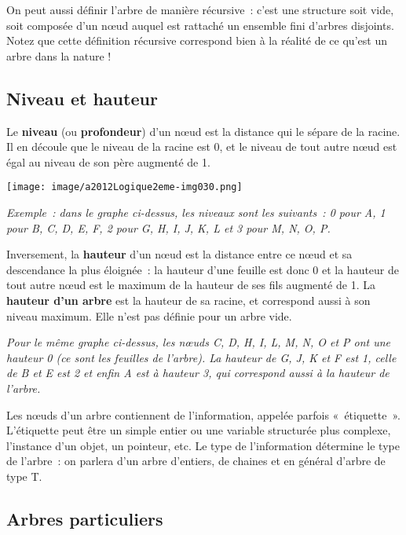 		On peut aussi définir l'arbre de manière récursive~: 
		c'est une structure soit vide, soit composée d'un n{\oe}ud auquel
		est rattaché un ensemble fini d'arbres disjoints. 
		Notez que cette définition récursive correspond bien à la réalité de
		ce qu'est un arbre dans la nature !

	\subsection{Niveau et hauteur}

		Le \textbf{niveau} (ou \textbf{profondeur}) d'un n{\oe}ud 
		est la distance qui le sépare de la racine. Il en découle que
		le niveau de la racine est 0, et le niveau de tout autre 
		n{\oe}ud est égal au niveau de son père augmenté de 1.

		\begin{center}
		\texttt{[image: image/a2012Logique2eme-img030.png]}
		\end{center}

		{\itshape	
		Exemple~: dans le graphe ci-dessus, les niveaux sont les suivants~: 
		0 pour A, 1 pour B, C, D, E, F, 2 pour G, H, I, J, K, L 
		et 3 pour M, N, O, P.}

		Inversement, la \textbf{hauteur} d'un n{\oe}ud est la distance entre 
		ce n{\oe}ud et sa descendance la plus éloignée~: la hauteur d'une 
		feuille est donc 0 et la hauteur de tout autre n{\oe}ud est le maximum 
		de la hauteur de ses fils augmenté de 1. La \textbf{hauteur d'un arbre} 
		est la hauteur de sa racine, et correspond aussi à son niveau maximum. 
		Elle n'est pas définie pour un arbre vide.

		{\itshape
		Pour le même graphe ci-dessus, les n{\oe}uds C, D, H, I, L, M, N, O et P 
		ont une hauteur 0 (ce sont les feuilles de l'arbre). 
		La hauteur de G, J, K et F est 1, celle de B et E est 2 
		et enfin A est à hauteur 3, qui correspond aussi à la hauteur de l'arbre.}

		Les n{\oe}uds d'un arbre contiennent de l'information, 
		appelée parfois «~étiquette~». L'étiquette peut être un simple
		entier ou une variable structurée plus complexe, l'instance 
		d'un objet, un pointeur, etc. Le type de l'information
		détermine le type de l'arbre~: on parlera d'un arbre 
		d'entiers, de chaines et en général d'arbre de type T.
	
	\subsection{Arbres particuliers}
	
